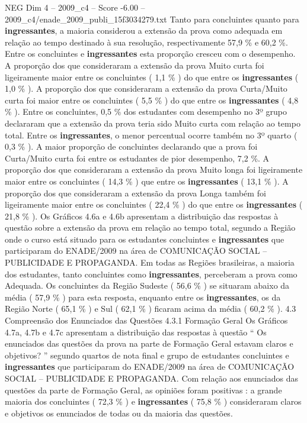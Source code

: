 \begin{textsample}{NEG Dim 4 – 2009\_c4 – Score -6.00 – 2009\_c4/enade\_2009\_publi\_15f3034279.txt}
Tanto para concluintes quanto para \textbf{ingressantes}, a maioria considerou a extensão da prova como adequada em relação ao tempo destinado à sua resolução, respectivamente 57,9 \% e 60,2 \%.
Entre os concluintes e \textbf{ingressantes} esta proporção cresceu com o desempenho.
A proporção dos que consideraram a extensão da prova Muito curta foi ligeiramente maior entre os concluintes ( 1,1 \% ) do que entre os \textbf{ingressantes} ( 1,0 \% ).
A proporção dos que consideraram a extensão da prova Curta/Muito curta foi maior entre os concluintes ( 5,5 \% ) do que entre os \textbf{ingressantes} ( 4,8 \% ).
Entre os concluintes, 0,5 \% dos estudantes com desempenho no 3º grupo declararam que a extensão da prova teria sido Muito curta com relação ao tempo total.
Entre os \textbf{ingressantes}, o menor percentual ocorre também no 3º quarto ( 0,3 \% ).
A maior proporção de concluintes declarando que a prova foi Curta/Muito curta foi entre os estudantes de pior desempenho, 7,2 \%.
A proporção dos que consideraram a extensão da prova Muito longa foi ligeiramente maior entre os concluintes ( 14,3 \% ) que entre os \textbf{ingressantes} ( 13,1 \% ).
A proporção dos que consideraram a extensão da prova Longa também foi ligeiramente maior entre os concluintes ( 22,4 \% ) do que entre os \textbf{ingressantes} ( 21,8 \% ).
Os Gráficos 4.6a e 4.6b apresentam a distribuição das respostas à questão sobre a extensão da prova em relação ao tempo total, segundo a Região onde o curso está situado para os estudantes concluintes e \textbf{ingressantes} que participaram do ENADE/2009 na área de COMUNICAÇÃO SOCIAL – PUBLICIDADE E PROPAGANDA.
Em todas as Regiões brasileiras, a maioria dos estudantes, tanto concluintes como \textbf{ingressantes}, perceberam a prova como Adequada.
Os concluintes da Região Sudeste ( 56,6 \% ) se situaram abaixo da média ( 57,9 \% ) para esta resposta, enquanto entre os \textbf{ingressantes}, os da Região Norte ( 65,1 \% ) e Sul ( 62,1 \% ) ficaram acima da média ( 60,2 \% ). 4.3 Compreensão dos Enunciados das Questões 4.3.1 Formação Geral Os Gráficos 4.7a, 4.7b e 4.7c apresentam a distribuição das respostas à questão “ Os enunciados das questões da prova na parte de Formação Geral estavam claros e objetivos? ” segundo quartos de nota final e grupo de estudantes concluintes e \textbf{ingressantes} que participaram do ENADE/2009 na área de COMUNICAÇÃO SOCIAL – PUBLICIDADE E PROPAGANDA.
Com relação aos enunciados das questões da parte de Formação Geral, as opiniões foram positivas : a grande maioria dos concluintes ( 72,3 \% ) e \textbf{ingressantes} ( 75,8 \% ) consideraram claros e objetivos os enunciados de todas ou da maioria das questões.

\end{textsample}
